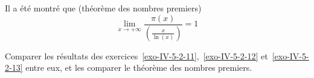 \begin{exo}
Il a été montré que (théorème des nombres premiers)
$$\lim_{x \to + \infty} \frac{\pi(x)}{\left(\frac{x}{\ln(x)}\right)} = 1$$

Comparer les résultats des exercices~\ref{exo-IV-5-2-11},~\ref{exo-IV-5-2-12} et~\ref{exo-IV-5-2-13} entre eux, et les comparer le théorème des nombres premiers.
\end{exo}











